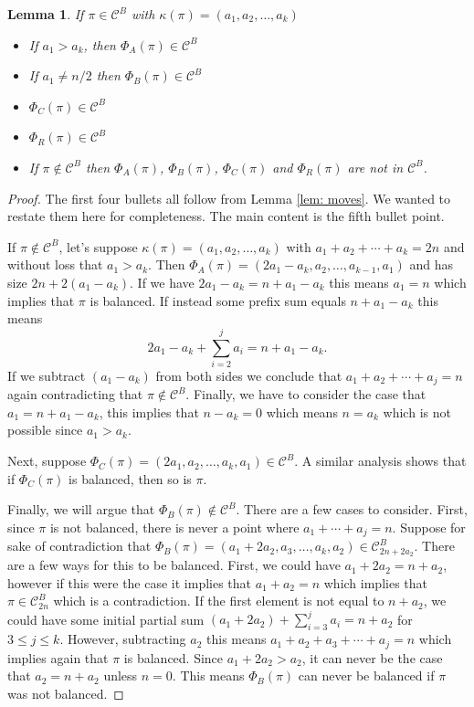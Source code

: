 \documentclass[11pt]{article}
\newcommand\C{\mathcal C}
\newtheorem{lemma}[theorem]{Lemma}
\theoremstyle{definition}
\begin{document}
\begin{lemma} \label{lem: move-unbalance}
    If $\pi \in \C^B$ with $\kappa(\pi) = (a_1,a_2,\dots,a_k)$
    \begin{itemize}
        \item If $a_1 > a_k$, then $\Phi_A(\pi) \in \C^B$
        \item If $a_1 \not= n/2$ then $\Phi_B(\pi) \in \C^B$
        \item $\Phi_C(\pi) \in \C^B$
        \item $\Phi_R(\pi) \in \C^B$
        \item If $\pi \not\in \C^B$ then $\Phi_A(\pi)$, $\Phi_B(\pi)$, $\Phi_C(\pi)$ and $\Phi_R(\pi)$ are not in $\C^B$.
    \end{itemize}
\end{lemma}

\begin{proof}
    The first four bullets all follow from Lemma \ref{lem: moves}. We wanted to restate them here for completeness. The main content is the fifth bullet point.
    
    If $\pi \not\in \C^B$, let's suppose $\kappa(\pi) = (a_1,a_2,\dots,a_k)$ with $a_1+a_2+ \cdots + a_k = 2n$ and without loss that $a_1 > a_k$. Then $\Phi_A(\pi) = (2a_1 - a_k, a_2,\dots,a_{k-1}, a_1)$ and has size $2n + 2(a_1-a_k)$. If we have $2a_1-a_k = n + a_1-a_k$ this means $a_1 = n$ which implies that $\pi$ is balanced. If instead some prefix sum equals $n + a_1 - a_k$ this means
    \[
    2a_1 - a_k + \sum_{i=2}^j a_i = n + a_1 - a_k.
    \]
    If we subtract $(a_1-a_k)$ from both sides we conclude that $a_1 + a_2 + \cdots + a_j = n$ again contradicting that $\pi \not\in \C^B$. Finally, we have to consider the case that $a_1 = n + a_1 - a_k$, this implies that $n - a_k = 0$ which means $n = a_k$ which is not possible since $a_1 > a_k$.

    Next, suppose $\Phi_C(\pi) = (2a_1,a_2,\dots,a_k,a_1) \in \C^B$. A similar analysis shows that if $\Phi_C(\pi)$ is balanced, then so is $\pi$.
    
    Finally, we will argue that $\Phi_B(\pi) \not\in \C^B$. There are a few cases to consider. First,  since $\pi$ is not balanced, there is never a point where $a_1 + \cdots + a_j = n$. Suppose for sake of contradiction that $\Phi_B(\pi) = (a_1+2a_2,a_3,\dots,a_k,a_2) \in \C_{2n+2a_2}^B$.  There are a few ways for this to be balanced. First, we could have $a_1+2a_2 = n + a_2$, however if this were the case it implies that $a_1 + a_2 = n$ which implies that $\pi \in \C_{2n}^B$ which is a contradiction. If the first element is not equal to $n + a_2$, we could have some initial partial sum $(a_1+2a_2) + \sum_{i=3}^j a_i = n + a_2$ for $3 \leq j \le k$. However, subtracting $a_2$ this means $a_1 + a_2 + a_3 + \cdots + a_j = n$ which implies again that $\pi$ is balanced. Since $a_1 + 2a_2 > a_2$, it can never be the case that $a_2 = n + a_2$ unless $n = 0$. This means $\Phi_B(\pi)$ can never be balanced if $\pi$ was not balanced.
\end{proof}
\end{document}
